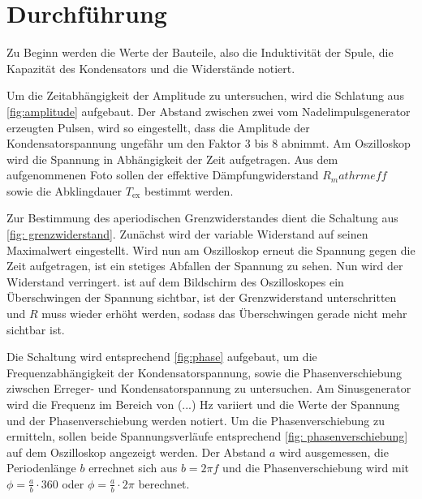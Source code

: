 \section{Durchführung}
\label{sec:durchführung}

Zu Beginn werden die Werte der Bauteile, also die Induktivität der Spule, die Kapazität des Kondensators und die Widerstände notiert.


Um die Zeitabhängigkeit der Amplitude zu untersuchen, wird die Schlatung aus \ref{fig:amplitude} aufgebaut. Der Abstand zwischen zwei vom Nadelimpulsgenerator erzeugten Pulsen, wird so eingestellt, dass die Amplitude der Kondensatorspannung ungefähr um den Faktor 3 bis 8 abnimmt. Am Oszilloskop wird die Spannung in Abhängigkeit der Zeit aufgetragen. Aus dem aufgenommenen Foto sollen der effektive Dämpfungwiderstand $R_mathrm{eff}$ sowie die Abklingdauer $T_\mathrm{ex}$ bestimmt werden.


Zur Bestimmung des aperiodischen Grenzwiderstandes dient die Schaltung aus \ref{fig: grenzwiderstand}. Zunächst wird der variable Widerstand auf seinen Maximalwert eingestellt. Wird nun am Oszilloskop erneut die Spannung gegen die Zeit aufgetragen, ist ein stetiges Abfallen der Spannung zu sehen. Nun wird der Widerstand verringert. ist auf dem Bildschirm des Oszilloskopes ein Überschwingen der Spannung sichtbar, ist der Grenzwiderstand unterschritten und $R$ muss wieder erhöht werden, sodass das Überschwingen gerade nicht mehr sichtbar ist.


Die Schaltung wird entsprechend \ref{fig:phase} aufgebaut, um die Frequenzabhängigkeit der Kondensatorspannung, sowie die Phasenverschiebung ziwschen Erreger- und Kondensatorspannung zu untersuchen. Am Sinusgenerator wird die Frequenz im Bereich von (...) \si{\Hz} variiert und die Werte der Spannung und der Phasenverschiebung werden notiert. Um die Phasenverschiebung zu ermitteln, sollen beide Spannungsverläufe entsprechend \ref{fig: phasenverschiebung} auf dem Oszilloskop angezeigt werden. Der Abstand $a$ wird ausgemessen, die Periodenlänge $b$ errechnet sich aus $b = 2\pi f$ und die Phasenverschiebung wird mit $\phi = \frac{a}{b} \cdot 360$ oder $\phi = \frac{a}{b} \cdot 2\pi $ berechnet.

